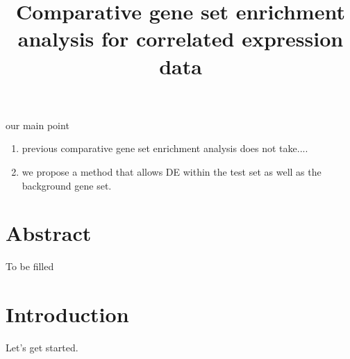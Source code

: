 \documentclass[11pt, a4paper]{article}
\title{Comparative gene set enrichment analysis for correlated expression data}
\date{} %
\begin{document}
our main point
\begin{enumerate}
	\item previous comparative gene set enrichment analysis does not take....
	\item we propose a method that allows DE within the test set as well as the background gene set.
\end{enumerate}


\newpage
\maketitle

\section*{Abstract}
To be filled

\section{Introduction}\label{section:Introduction}
Let's get started.
\newpage




\end{document}
